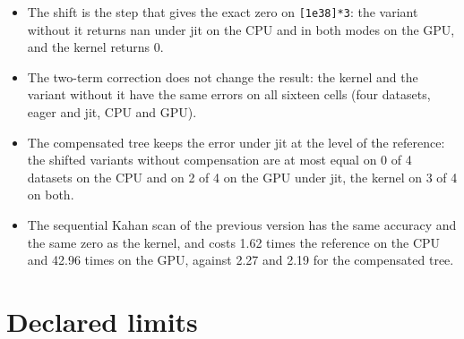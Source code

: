 \documentclass[11pt]{article}
\begin{document}
\begin{itemize}
\item The shift is the step that gives the exact zero on \texttt{[1e38]*3}: the variant without it returns nan under jit on the CPU and in both modes on the GPU, and the kernel returns 0.
\item The two-term correction does not change the result: the kernel and the variant without it have the same errors on all sixteen cells (four datasets, eager and jit, CPU and GPU).
\item The compensated tree keeps the error under jit at the level of the reference: the shifted variants without compensation are at most equal on 0 of 4 datasets on the CPU and on 2 of 4 on the GPU under jit, the kernel on 3 of 4 on both.
\item The sequential Kahan scan of the previous version has the same accuracy and the same zero as the kernel, and costs 1.62 times the reference on the CPU and 42.96 times on the GPU, against 2.27 and 2.19 for the compensated tree.
\end{itemize}

\section{Declared limits}
\end{document}
